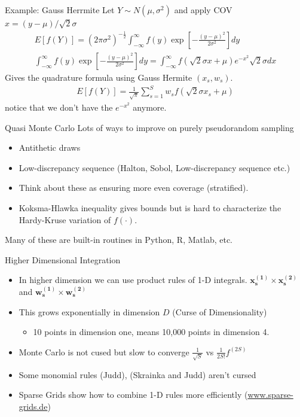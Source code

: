\documentclass[xcolor=pdftex,dvipsnames,table,mathserif,aspectratio=169]{beamer}
\begin{document}
\begin{frame}{Example: Gauss Herrmite}
Let $Y\sim N(\mu,\sigma^2)$ and apply COV $x = (y-\mu)/\sqrt{2} \sigma$
\begin{eqnarray*}
E[f(Y)] = (2 \pi \sigma^2)^{-\frac{1}{2}} \int_{-\infty}^{\infty} f(y) \exp\left[-\frac{(y-\mu)^2}{2\sigma^2} \right] dy \\
\int_{-\infty}^{\infty} f(y) \exp\left[-\frac{(y-\mu)^2}{2\sigma^2} \right] dy = \int_{-\infty}^{\infty} f(\sqrt{2} \sigma x + \mu) e^{-x^2} \sqrt{2} \sigma dx
\end{eqnarray*}
Gives the quadrature formula using Gauss Hermite $(x_s,w_s)$.
\begin{eqnarray*}
E[f(Y)] = \frac{1}{\sqrt{\pi}} \sum_{s=1}^S w_s f(\sqrt{2}\sigma x_s+ \mu)
\end{eqnarray*}
notice that we don't have the $e^{-x^2}$ anymore.
\end{frame}



\begin{frame}{Quasi Monte Carlo}
Lots of ways to improve on purely pseudorandom sampling
\begin{itemize}
\item Antithetic draws
\item Low-discrepancy sequence (Halton, Sobol, Low-discrepancy sequence etc.) 
\item Think about these as ensuring more even coverage (stratified).
\item Koksma-Hlawka inequality gives bounds but is hard to characterize the Hardy-Kruse variation of $f(\cdot)$.
\end{itemize}
Many of these are built-in routines in Python, R, Matlab, etc.
\end{frame}







\begin{frame}{Higher Dimensional Integration}
\begin{itemize}
\item In higher dimension we can use product rules of 1-D integrals. $\mathbf{x_s^{(1)}} \times \mathbf{x_s^{(2)}}$ and $\mathbf{w_s^{(1)}} \times \mathbf{w_s^{(2)}}$
\item This grows exponentially in dimension $D$ (Curse of Dimensionality)
\begin{itemize}
\item 10 points in dimension one, means 10{,}000 points in dimension 4.
\end{itemize}

\item Monte Carlo is not cused but slow to converge $\frac{1}{\sqrt{S}}$ vs $\frac{1}{2S!} f^{(2S)}$
\item Some monomial rules (Judd), (Skrainka and Judd) aren't cursed
\item Sparse Grids show how to combine 1-D rules more efficiently (\url{www.sparse-grids.de})
\end{itemize}
\end{frame}
\end{document}
